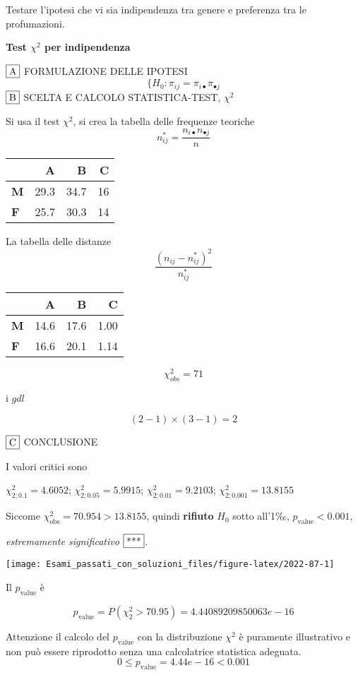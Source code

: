 \documentclass[
  11pt,
]{book}
\theoremstyle{mytheoremstyle}
\theoremstyle{mydefstyle}
\newenvironment{sol}
  {
  \begin{tcolorbox}[enhanced,breakable,arc=0.1mm,boxrule=1pt,colback=white,colframe=iblue,
  title=\bf \fontfamily{lmss}\selectfont \hspace{.5 cm} Soluzione,drop fuzzy shadow]

}{
\end{tcolorbox}
  }
\begin{document}
Testare l'ipotesi che vi sia indipendenza tra genere e preferenza tra le profumazioni.

\begin{sol}
\textbf{Test \(\chi^2\) per indipendenza}

\(\fbox{A}\) FORMULAZIONE DELLE IPOTESI
\[
\Big\{H_0:\pi_{ij}=\pi_{i\bullet}\pi_{\bullet j}
\]
\(\fbox{B}\) SCELTA E CALCOLO STATISTICA-TEST, \(\chi^2\)

Si usa il test \(\chi^2\), si crea la tabella delle frequenze teoriche
\[
n_{ij}^*=\frac{n_{i\bullet}n_{\bullet j}}{n}
\]

\begin{table}[H]
\centering
\begin{tabular}{>{}lrrr}
\toprule
  & A & B & C\\
\midrule
\textbf{M} & 29.3 & 34.7 & 16\\
\textbf{F} & 25.7 & 30.3 & 14\\
\bottomrule
\end{tabular}
\end{table}

La tabella delle distanze
\[
\frac{(n_{ij}-n_{ij}^*)^2}{n_{ij}^*}
\]

\begin{table}[H]
\centering
\begin{tabular}{>{}lrrr}
\toprule
  & A & B & C\\
\midrule
\textbf{M} & 14.6 & 17.6 & 1.00\\
\textbf{F} & 16.6 & 20.1 & 1.14\\
\bottomrule
\end{tabular}
\end{table}

\[
    \chi^2_{obs}= 71 
  \]

i \(gdl\)

\[
    ( 2 -1)\times( 3 -1)= 2 
  \]

\(\fbox{C}\) CONCLUSIONE

I valori critici sono

\(\chi^2_{2;0.1}=4.6052\); \(\chi^2_{2;0.05}=5.9915\); \(\chi^2_{2;0.01}=9.2103\); \(\chi^2_{2;0.001}=13.8155\)

Siccome \(\chi^2_\text{obs}=70.954>13.8155\), quindi \textbf{rifiuto} \(H_0\) sotto all'1‰, \(p_\text{value}<0.001\),

\emph{estremamente significativo} \(\fbox{***}\).

\begin{center}\texttt{[image: Esami\_passati\_con\_soluzioni\_files/figure-latex/2022-87-1]} \end{center}

Il \(p_{\text{value}}\) è

\[ p_{\text{value}} = P(\chi^2_{2}>70.95)=4.44089209850063e-16 \]

Attenzione il calcolo del \(p_\text{value}\) con la distribuzione \(\chi^2\) è puramente illustrativo e non può essere riprodotto senza una calcolatrice statistica adeguata.\[
 0 \leq p_\text{value}= 4.44e-16 < 0.001 
\]

\end{sol}
\end{document}
